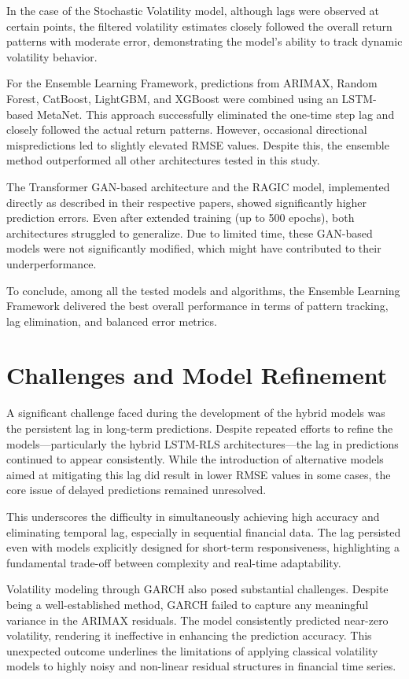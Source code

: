 In the case of the Stochastic Volatility model, although lags were observed at certain points, the filtered volatility estimates closely followed the overall return patterns with moderate error, demonstrating the model's ability to track dynamic volatility behavior.

For the Ensemble Learning Framework, predictions from ARIMAX, Random Forest, CatBoost, LightGBM, and XGBoost were combined using an LSTM-based MetaNet. This approach successfully eliminated the one-time step lag and closely followed the actual return patterns. However, occasional directional mispredictions led to slightly elevated RMSE values. Despite this, the ensemble method outperformed all other architectures tested in this study.

The Transformer GAN-based architecture and the RAGIC model, implemented directly as described in their respective papers, showed significantly higher prediction errors. Even after extended training (up to 500 epochs), both architectures struggled to generalize. Due to limited time, these GAN-based models were not significantly modified, which might have contributed to their underperformance.

To conclude, among all the tested models and algorithms, the Ensemble Learning Framework delivered the best overall performance in terms of pattern tracking, lag elimination, and balanced error metrics.
\section{Challenges and Model Refinement}
A significant challenge faced during the development of the hybrid models was the persistent lag in long-term predictions. Despite repeated efforts to refine the models—particularly the hybrid LSTM-RLS architectures—the lag in predictions continued to appear consistently. While the introduction of alternative models aimed at mitigating this lag did result in lower RMSE values in some cases, the core issue of delayed predictions remained unresolved.

This underscores the difficulty in simultaneously achieving high accuracy and eliminating temporal lag, especially in sequential financial data. The lag persisted even with models explicitly designed for short-term responsiveness, highlighting a fundamental trade-off between complexity and real-time adaptability.

Volatility modeling through GARCH also posed substantial challenges. Despite being a well-established method, GARCH failed to capture any meaningful variance in the ARIMAX residuals. The model consistently predicted near-zero volatility, rendering it ineffective in enhancing the prediction accuracy. This unexpected outcome underlines the limitations of applying classical volatility models to highly noisy and non-linear residual structures in financial time series.

